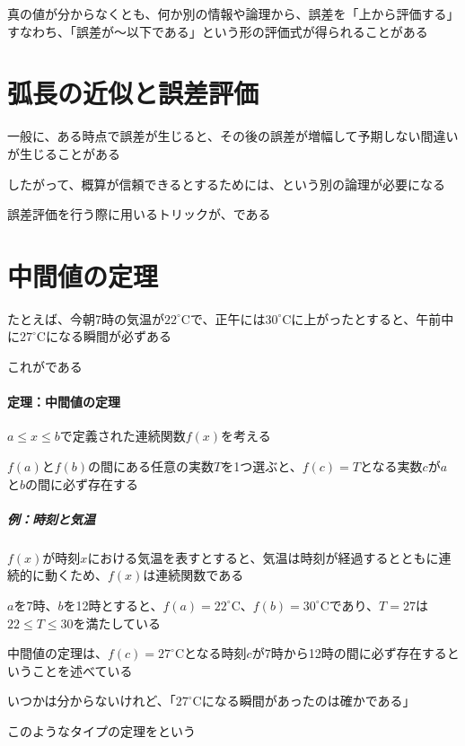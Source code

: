 \documentclass[../book_jiriki_calc]{subfiles}
\begin{document}
\sectionline

真の値が分からなくとも、何か別の情報や論理から、誤差を「上から評価する」すなわち、「誤差が〜以下である」という形の評価式が得られることがある

\section*{弧長の近似と誤差評価}

一般に、ある時点で誤差が生じると、その後の誤差が増幅して予期しない間違いが生じることがある

したがって、概算が信頼できるとするためには、という別の論理が必要になる

誤差評価を行う際に用いるトリックが、である

\section*{中間値の定理}

たとえば、今朝7時の気温が$22^\circ$Cで、正午には$30^\circ$Cに上がったとすると、午前中に$27^\circ$Cになる瞬間が必ずある

これがである

\sectionline

\paragraph{定理：中間値の定理}

$a \leq x \leq b$で定義された連続関数$f(x)$を考える

$f(a)$と$f(b)$の間にある任意の実数$T$を1つ選ぶと、$f(c)=T$となる実数$c$が$a$と$b$の間に必ず存在する

\sectionline

\subparagraph{例：時刻と気温}

$f(x)$が時刻$x$における気温を表すとすると、気温は時刻が経過するとともに連続的に動くため、$f(x)$は連続関数である

$a$を7時、$b$を12時とすると、$f(a)=22^\circ$C、$f(b)=30^\circ$Cであり、$T=27$は$22\leq T\leq 30$を満たしている

中間値の定理は、$f(c)=27^\circ$Cとなる時刻$c$が7時から12時の間に必ず存在するということを述べている

\sectionline

いつかは分からないけれど、「$27^\circ$Cになる瞬間があったのは確かである」

このようなタイプの定理をという
\end{document}
